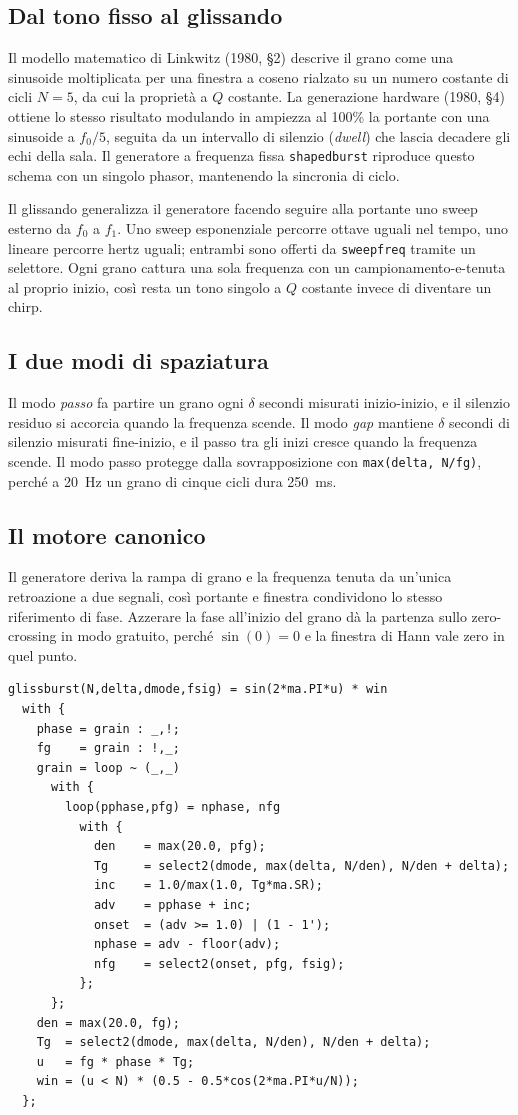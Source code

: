 \documentclass[11pt,a4paper]{article}
\begin{document}
\subsection{Dal tono fisso al glissando}
Il modello matematico di Linkwitz (1980, \S2) descrive il grano come una sinusoide moltiplicata per una finestra a coseno rialzato su un numero costante di cicli $N=5$, da cui la propriet\`a a $Q$ costante.
La generazione hardware (1980, \S4) ottiene lo stesso risultato modulando in ampiezza al 100\% la portante con una sinusoide a $f_0/5$, seguita da un intervallo di silenzio (\emph{dwell}) che lascia decadere gli echi della sala.
Il generatore a frequenza fissa \texttt{shapedburst} riproduce questo schema con un singolo phasor, mantenendo la sincronia di ciclo.

Il glissando generalizza il generatore facendo seguire alla portante uno sweep esterno da $f_0$ a $f_1$.
Uno sweep esponenziale percorre ottave uguali nel tempo, uno lineare percorre hertz uguali; entrambi sono offerti da \texttt{sweepfreq} tramite un selettore.
Ogni grano cattura una sola frequenza con un campionamento-e-tenuta al proprio inizio, cos\`i resta un tono singolo a $Q$ costante invece di diventare un chirp.

\subsection{I due modi di spaziatura}
Il modo \emph{passo} fa partire un grano ogni $\delta$ secondi misurati inizio-inizio, e il silenzio residuo si accorcia quando la frequenza scende.
Il modo \emph{gap} mantiene $\delta$ secondi di silenzio misurati fine-inizio, e il passo tra gli inizi cresce quando la frequenza scende.
Il modo passo protegge dalla sovrapposizione con \texttt{max(delta, N/fg)}, perch\'e a \SI{20}{\hertz} un grano di cinque cicli dura \SI{250}{\milli\second}.

\subsection{Il motore canonico}
Il generatore deriva la rampa di grano e la frequenza tenuta da un'unica retroazione a due segnali, cos\`i portante e finestra condividono lo stesso riferimento di fase.
Azzerare la fase all'inizio del grano d\`a la partenza sullo zero-crossing in modo gratuito, perch\'e $\sin(0)=0$ e la finestra di Hann vale zero in quel punto.

\begin{lstlisting}
glissburst(N,delta,dmode,fsig) = sin(2*ma.PI*u) * win
  with {
    phase = grain : _,!;
    fg    = grain : !,_;
    grain = loop ~ (_,_)
      with {
        loop(pphase,pfg) = nphase, nfg
          with {
            den    = max(20.0, pfg);
            Tg     = select2(dmode, max(delta, N/den), N/den + delta);
            inc    = 1.0/max(1.0, Tg*ma.SR);
            adv    = pphase + inc;
            onset  = (adv >= 1.0) | (1 - 1');
            nphase = adv - floor(adv);
            nfg    = select2(onset, pfg, fsig);
          };
      };
    den = max(20.0, fg);
    Tg  = select2(dmode, max(delta, N/den), N/den + delta);
    u   = fg * phase * Tg;
    win = (u < N) * (0.5 - 0.5*cos(2*ma.PI*u/N));
  };
\end{lstlisting}
\end{document}
